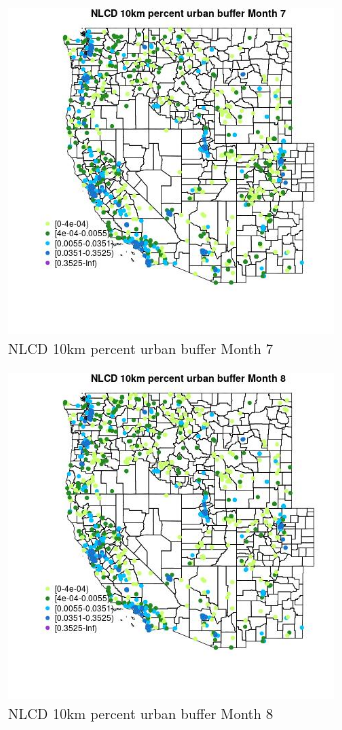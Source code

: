 \begin{figure} 
\centering  
\includegraphics[width=0.77\textwidth]{Code_Outputs/Report_ML_input_PM25_Step4_part_e_de_duplicated_aves_compiled_2019-05-21wNAs_MapObsMo7NLCD_10km_percent_urban_buffer.jpg} 
\caption{\label{fig:Report_ML_input_PM25_Step4_part_e_de_duplicated_aves_compiled_2019-05-21wNAsMapObsMo7NLCD_10km_percent_urban_buffer}NLCD 10km percent urban buffer Month 7} 
\end{figure} 
 

\begin{figure} 
\centering  
\includegraphics[width=0.77\textwidth]{Code_Outputs/Report_ML_input_PM25_Step4_part_e_de_duplicated_aves_compiled_2019-05-21wNAs_MapObsMo8NLCD_10km_percent_urban_buffer.jpg} 
\caption{\label{fig:Report_ML_input_PM25_Step4_part_e_de_duplicated_aves_compiled_2019-05-21wNAsMapObsMo8NLCD_10km_percent_urban_buffer}NLCD 10km percent urban buffer Month 8} 
\end{figure} 
 

